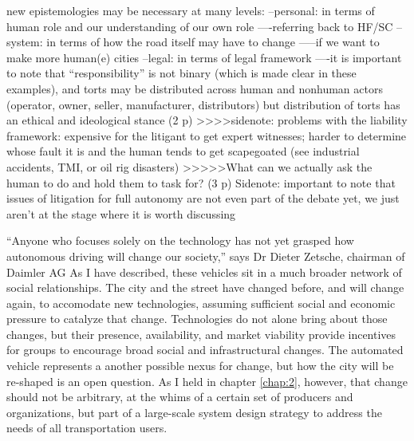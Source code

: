 new epistemologies may be necessary at many levels:
--personal: in terms of human role and our understanding of our own role
----referring back to HF/SC
--system: in terms of how the road itself may have to change
-----if we want to make more human(e) cities
--legal: in terms of legal framework
----it is important to note that ``responsibility'' is not binary
(which is made clear in these examples), and torts may be distributed
across human and nonhuman actors (operator, owner, seller,
manufacturer, distributors) but distribution of torts has an ethical
and ideological stance (2 p)
>>>>sidenote: problems with the liability framework: expensive for the
litigant to get expert witnesses; harder to determine whose fault it
is and the human tends to get scapegoated (see industrial accidents,
TMI, or oil rig disasters)
>>>>>What can we actually ask the human to do and hold them to task
for? (3 p)
Sidenote: important to note that issues of litigation for full autonomy are
not even part of the debate yet, we just aren't at the stage where it
is worth discussing

``Anyone who focuses solely on the technology has not yet grasped how
autonomous driving will change our society,'' says Dr Dieter Zetsche,
chairman of Daimler AG
\cite{???-http://www.slashgear.com/how-mercedes-f-015-self-driving-car-is-shaping-smart-cities-20374602/}
As I have described, these vehicles sit in a much broader network of
social relationships. The city and the street have changed before, and
will change again, to accomodate new technologies, assuming sufficient
social and economic pressure to catalyze that change. Technologies do
not alone bring about those changes, but their presence, availability,
and market viability provide incentives for groups to encourage broad
social and infrastructural changes. The automated vehicle represents a
another possible nexus for change, but how the city will be re-shaped
is an open question. As I held in chapter \ref{chap:2}, however, that
change should not be arbitrary, at the whims of a certain set of
producers and organizations, but part of a large-scale system design
strategy to address the needs of all transportation users.
